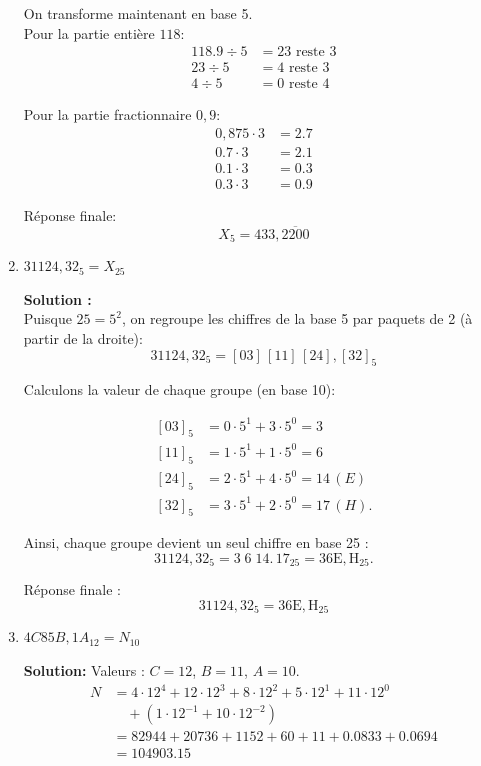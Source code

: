 \documentclass{article}
\begin{document}
\begin{enumerate}[label=\alph*), itemsep=2em]
    On transforme maintenant en base 5. \\
    Pour la partie entière $118$:
    \[
    \begin{aligned}
    118.9 \div 5 &= 23 \text{ reste } 3 \\
    23 \div 5 &= 4 \text{ reste } 3 \\
    4 \div 5 &= 0 \text{ reste } 4
    \end{aligned}
    \]

    Pour la partie fractionnaire $0,9$:
    \[
    \begin{aligned}
    0,875 \cdot 3 &= 2.7 \\
    0.7 \cdot 3 &= 2.1 \\
    0.1 \cdot 3 &= 0.3 \\
    0.3 \cdot 3 &= 0.9
    \end{aligned}
    \]

    Réponse finale:
    \[
    X_{5} = 433,\overline{2200}
    \]
    
    \item $31124,32_{5} = X_{25}$

    \textbf{Solution :}\\
    Puisque $25 = 5^2$, on regroupe les chiffres de la base 5 par paquets de 2 (à partir de la droite):
    \[
    31124,32_{5} = [03]\,[11]\,[24],[32]_{5}
    \]

    Calculons la valeur de chaque groupe (en base 10):

    \[
    \begin{aligned}
    [03]_5 &= 0\cdot5^1 + 3\cdot5^0 = 3\\
    [11]_5 &= 1\cdot5^1 + 1\cdot5^0 = 6\\
    [24]_5 &= 2\cdot5^1 + 4\cdot5^0 = 14 \, (E)\\
    [32]_5 &= 3\cdot5^1 + 2\cdot5^0 = 17 \, (H).
    \end{aligned}
    \]

    Ainsi, chaque groupe devient un seul chiffre en base 25 :
    \[
    31124,32_{5} = 3\;6\;14 .\,17_{25} = 36\mathrm{E},\mathrm{H}_{25}.
    \]

    Réponse finale :
    \[
    31124,32_{5} = 36\mathrm{E},\mathrm{H}_{25}
    \]


    \item $4C85B,1A_{12} = N_{10}$

    \textbf{Solution:}  
    Valeurs : $C = 12$, $B = 11$, $A = 10$.
    \[
    \begin{aligned}
    N &= 4 \cdot 12^4 + 12 \cdot 12^3 + 8 \cdot 12^2 + 5 \cdot 12^1 + 11 \cdot 12^0 \\
      &\quad + \left(1 \cdot 12^{-1} + 10 \cdot 12^{-2}\right) \\
    &= 82944 + 20736 + 1152 + 60 + 11 + 0.0833 + 0.0694 \\
    &= 104903.15
    \end{aligned}
    \]


\end{enumerate}
\end{document}
